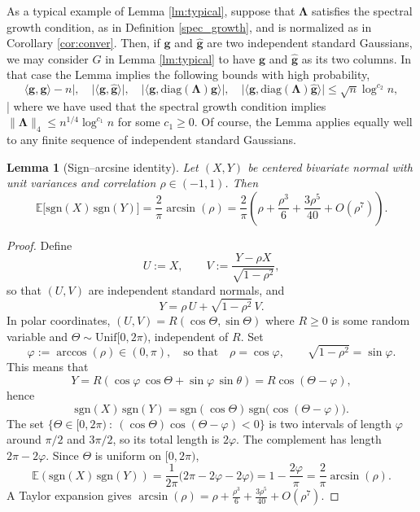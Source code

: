 \documentclass[reqno]{amsart}
\numberwithin{equation}{section}
\newcommand\E{\mathbb{E}}
\newcommand\bg{\bm{g}}
\newcommand\hg{\hat{\bm g}}
\newtheorem{lemma}[theorem]{Lemma}
\begin{document}
As a typical example of Lemma \ref{lm:typical}, suppose that $\bm{\Lambda}$ satisfies the spectral growth condition, as in Definition \ref{spec_growth}, and is normalized as in Corollary \ref{cor:conver}. Then, if $\bg$ and $\hg$ are two independent standard Gaussians, we may consider $G$ in Lemma \ref{lm:typical} to have $\bg$ and $\hg$ as its two columns. In that case the Lemma implies the following bounds with high probability,
\begin{equation} \label{eq:specconc}
    \langle \bg,\bg\rangle - n|, \quad|\langle \bg,\hg\rangle|,\quad |\langle \bg, \mathrm{diag}(\bm{\Lambda})\bg\rangle|,\quad |\langle \bg, \mathrm{diag}(\bm{\Lambda})\hg\rangle| \leq \sqrt{n}\log^{c_2}n,
\end{equation}|
where we have used that the spectral growth condition implies $\|\bm{\Lambda}\|_4 \leq n^{1/4}\log^{c_1}n$ for some $c_1\geq 0$.
Of course, the Lemma applies equally well to any finite sequence of independent standard Gaussians.

    \iffalse
\begin{lemma}[Sign--arcsine identity]
Let $(X,Y)$ be centered bivariate normal with unit variances and correlation $\rho\in(-1,1)$.
Then
\[
\E\!\big[\mathrm{sgn}(X)\,\mathrm{sgn}(Y)\big]
=\frac{2}{\pi}\arcsin(\rho)=\frac{2}{\pi}\left(\rho+\frac{\rho^3}{6}+\frac{3\rho^5}{40}+O(\rho^7)\right).
\]
\end{lemma}

\begin{proof}
Define
\[
U:=X,\qquad V:=\frac{Y-\rho X}{\sqrt{1-\rho^2}},
\]
so that $(U,V)$ are independent standard normals, and
\[
Y=\rho\,U+\sqrt{1-\rho^2}\,V.
\]
In polar coordinates, $(U,V)=R(\cos\Theta,\sin\Theta)$ where $R\ge0$ is some random variable and
$\Theta\sim\mathrm{Unif}[0,2\pi)$, independent of $R$. Set
\[\varphi:=\arccos(\rho)\in(0,\pi),\quad\text{so that}\quad 
\rho=\cos\varphi,\qquad \sqrt{1-\rho^2}=\sin\varphi.
\]
This means that
\[Y=R\left(\cos\varphi\, \cos\Theta+\sin\varphi \, \sin\theta \right)=R\cos(\Theta-\varphi),\]
hence 
\[
\mathrm{sgn}(X)\,\mathrm{sgn}(Y)
=\mathrm{sgn}(\cos\Theta)\,\mathrm{sgn}\big(\cos(\Theta-\varphi)\big).
\]
The set $\{\Theta\in [0,2\pi)\ \colon\ (\cos\Theta)\cos(\Theta-\varphi)<0\}$ is two intervals of length $\varphi$ around $\pi/2$ and $3\pi/2$, so its total length is $2\varphi$. The complement has length $2\pi-2\varphi$. Since $\Theta$ is uniform on $[0,2\pi)$, 
\[\E(\mathrm{sgn}(X)\,\mathrm{sgn}(Y))=\frac{1}{2\pi}\big(2\pi-2\varphi-2\varphi\big)=1-\frac{2\varphi}{\pi}=\frac{2}{\pi}\arcsin({\rho}).\]
A Taylor expansion gives $\arcsin({\rho})=\rho+\frac{\rho^3}{6}+\frac{3\rho^5}{40}+O(\rho^7)$.  
\end{proof}
\end{document}
